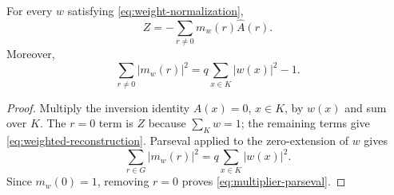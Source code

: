 \begin{theorem}
\label{thm:weighted-reconstruction}
For every \(w\) satisfying \eqref{eq:weight-normalization},
\begin{equation}
 \boxed{
 Z=-\sum_{r\ne0}m_w(r)\widehat A(r).}
\label{eq:weighted-reconstruction}
\end{equation}
Moreover,
\begin{equation}
 \sum_{r\ne0}|m_w(r)|^2
 =q\sum_{x\in K}|w(x)|^2-1.
\label{eq:multiplier-parseval}
\end{equation}
\end{theorem}

\begin{proof}
Multiply the inversion identity \(A(x)=0\), \(x\in K\), by \(w(x)\)
and sum over \(K\).  The \(r=0\) term is \(Z\) because
\(\sum_Kw=1\); the remaining terms give
\eqref{eq:weighted-reconstruction}.  Parseval applied to the
zero-extension of \(w\) gives
\[
 \sum_{r\in G}|m_w(r)|^2=q\sum_{x\in K}|w(x)|^2.
\]
Since \(m_w(0)=1\), removing \(r=0\) proves
\eqref{eq:multiplier-parseval}.
\end{proof}
